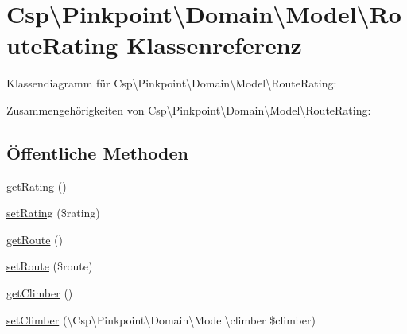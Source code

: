 \hypertarget{classCsp_1_1Pinkpoint_1_1Domain_1_1Model_1_1RouteRating}{}\section{Csp\textbackslash{}Pinkpoint\textbackslash{}Domain\textbackslash{}Model\textbackslash{}Route\+Rating Klassenreferenz}
\label{classCsp_1_1Pinkpoint_1_1Domain_1_1Model_1_1RouteRating}


Klassendiagramm für Csp\textbackslash{}Pinkpoint\textbackslash{}Domain\textbackslash{}Model\textbackslash{}Route\+Rating\+:


Zusammengehörigkeiten von Csp\textbackslash{}Pinkpoint\textbackslash{}Domain\textbackslash{}Model\textbackslash{}Route\+Rating\+:
\subsection*{Öffentliche Methoden}
\begin{DoxyCompactItemize}
\item 
\hyperlink{classCsp_1_1Pinkpoint_1_1Domain_1_1Model_1_1RouteRating_a59ab503378f3b1add8ba1fcaea5ae329}{get\+Rating} ()
\item 
\hyperlink{classCsp_1_1Pinkpoint_1_1Domain_1_1Model_1_1RouteRating_a2aa72d3d6e208eff34e38cad71465ae9}{set\+Rating} (\$rating)
\item 
\hyperlink{classCsp_1_1Pinkpoint_1_1Domain_1_1Model_1_1RouteRating_a26e04187da081091319c828bc0b8bad5}{get\+Route} ()
\item 
\hyperlink{classCsp_1_1Pinkpoint_1_1Domain_1_1Model_1_1RouteRating_a2ab32fd501d76e6c9794828b41b65896}{set\+Route} (\$route)
\item 
\hyperlink{classCsp_1_1Pinkpoint_1_1Domain_1_1Model_1_1RouteRating_aaeb32ee683b7bb69496fe4da05a7c13f}{get\+Climber} ()
\item 
\hyperlink{classCsp_1_1Pinkpoint_1_1Domain_1_1Model_1_1RouteRating_a7c6db719298666cc8dfc96aac3ac183f}{set\+Climber} (\textbackslash{}Csp\textbackslash{}\+Pinkpoint\textbackslash{}\+Domain\textbackslash{}\+Model\textbackslash{}climber \$climber)
\end{DoxyCompactItemize}
